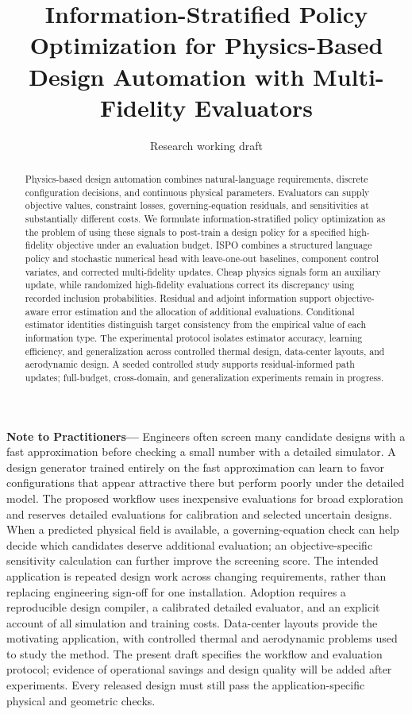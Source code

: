 \documentclass[journal,10pt]{IEEEtran}
\title{Information-Stratified Policy Optimization for Physics-Based Design Automation with Multi-Fidelity Evaluators}
\author{Research working draft}
\begin{document}
\maketitle
\begin{abstract}
Physics-based design automation combines natural-language requirements, discrete configuration decisions, and continuous physical parameters. Evaluators can supply objective values, constraint losses, governing-equation residuals, and sensitivities at substantially different costs. We formulate information-stratified policy optimization as the problem of using these signals to post-train a design policy for a specified high-fidelity objective under an evaluation budget. ISPO combines a structured language policy and stochastic numerical head with leave-one-out baselines, component control variates, and corrected multi-fidelity updates. Cheap physics signals form an auxiliary update, while randomized high-fidelity evaluations correct its discrepancy using recorded inclusion probabilities. Residual and adjoint information support objective-aware error estimation and the allocation of additional evaluations. Conditional estimator identities distinguish target consistency from the empirical value of each information type. The experimental protocol isolates estimator accuracy, learning efficiency, and generalization across controlled thermal design, data-center layouts, and aerodynamic design. A seeded controlled study supports residual-informed path updates; full-budget, cross-domain, and generalization experiments remain in progress.
\end{abstract}
\noindent\textbf{Note to Practitioners---}
Engineers often screen many candidate designs with a fast approximation before checking a small number with a detailed simulator. A design generator trained entirely on the fast approximation can learn to favor configurations that appear attractive there but perform poorly under the detailed model. The proposed workflow uses inexpensive evaluations for broad exploration and reserves detailed evaluations for calibration and selected uncertain designs. When a predicted physical field is available, a governing-equation check can help decide which candidates deserve additional evaluation; an objective-specific sensitivity calculation can further improve the screening score. The intended application is repeated design work across changing requirements, rather than replacing engineering sign-off for one installation. Adoption requires a reproducible design compiler, a calibrated detailed evaluator, and an explicit account of all simulation and training costs. Data-center layouts provide the motivating application, with controlled thermal and aerodynamic problems used to study the method. The present draft specifies the workflow and evaluation protocol; evidence of operational savings and design quality will be added after experiments. Every released design must still pass the application-specific physical and geometric checks.
\end{document}
